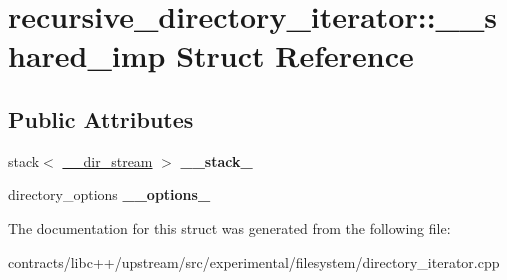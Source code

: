 \hypertarget{structrecursive__directory__iterator_1_1____shared__imp}{}\section{recursive\+\_\+directory\+\_\+iterator\+:\+:\+\_\+\+\_\+shared\+\_\+imp Struct Reference}
\label{structrecursive__directory__iterator_1_1____shared__imp}
\subsection*{Public Attributes}
\begin{DoxyCompactItemize}
\item 
\mbox{\label{structrecursive__directory__iterator_1_1____shared__imp_ab14ebeeb18d091f2e926e56fa0ade63e}} 
stack$<$ \mbox{\hyperlink{class____dir__stream}{\+\_\+\+\_\+dir\+\_\+stream}} $>$ {\bfseries \+\_\+\+\_\+stack\+\_\+}
\item 
\mbox{\label{structrecursive__directory__iterator_1_1____shared__imp_a64c4104a09445117d2288cf2128e7020}} 
directory\+\_\+options {\bfseries \+\_\+\+\_\+options\+\_\+}
\end{DoxyCompactItemize}


The documentation for this struct was generated from the following file\+:\begin{DoxyCompactItemize}
\item 
contracts/libc++/upstream/src/experimental/filesystem/directory\+\_\+iterator.\+cpp\end{DoxyCompactItemize}
